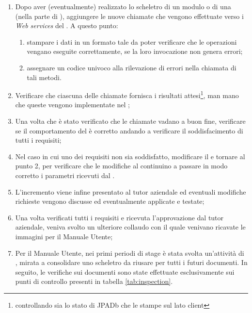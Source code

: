 \begin{enumerate}
\item Dopo aver (eventualmente) realizzato lo scheletro di un modulo o di una
   (nella parte di \FREND{}), aggiungere le nuove chiamate
   che vengono effettuate verso i \emph{Web services} del \BKEND{}.
  A questo punto:
  \begin{enumerate}
  \item stampare i dati in un formato tale da poter verificare che le
    operazioni vengano eseguite correttamente, se la loro invocazione non
    genera errori;
  \item assegnare un codice univoco alla rilevazione di errori nella chiamata
    di tali metodi.
  \end{enumerate}
\item Verificare che ciascuna delle chiamate  fornisca i risultati
  attesi\footnote{controllando sia lo stato di JPADb che le stampe sul lato
  client}, man mano che queste vengono implementate nel \BKEND{};
\item Una volta che è stato verificato che le chiamate  vadano a
  buon fine, verificare se il comportamento del \FREND{} è corretto andando a
  verificare il soddisfacimento di tutti i requisiti;
\item Nel caso in cui uno dei requisiti non sia soddisfatto, modificare il
  \FREND{} e tornare al punto 2, per verificare che le modifiche al \FREND{}
  continuino a passare in modo corretto i parametri ricevuti dal \BKEND{}.
\item L'incremento viene infine presentato al tutor aziendale ed eventuali
  modifiche richieste vengono discusse ed eventualmente applicate e testate;
\item Una volta verificati tutti i requisiti e ricevuta l'approvazione dal
  tutor aziendale, veniva svolto un ulteriore collaudo con il quale venivano
  ricavate le immagini per il Manuale Utente;
\item Per il Manuale Utente, nei primi periodi di stage è stata svolta
  un'attività di , mirata a consolidare uno scheletro da
  riusare per tutti i futuri documenti. In seguito, le verifiche sui documenti
  sono state effettuate esclusivamente sui punti di controllo presenti in
  tabella \ref{tab:inspection}. \\
\end{enumerate}

